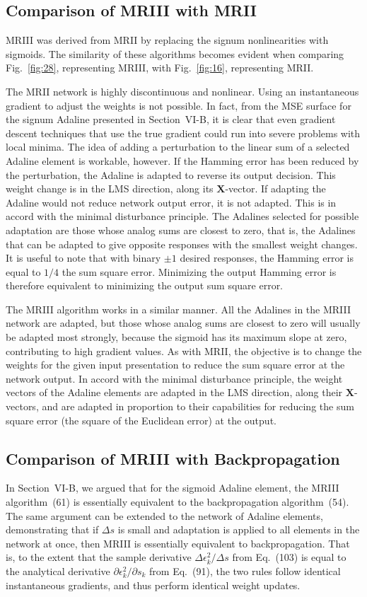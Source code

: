 \documentclass[10pt,twocolumn]{article}
\newcommand{\X}{\bm{X}}
\begin{document}
\subsection{Comparison of MRIII with MRII}
MRIII was derived from MRII by replacing the signum nonlinearities with sigmoids.
The similarity of these algorithms becomes evident when comparing Fig.~\ref{fig:28},
representing MRIII, with Fig.~\ref{fig:16}, representing MRII.

The MRII network is highly discontinuous and nonlinear. Using an instantaneous
gradient to adjust the weights is not possible. In fact, from the MSE surface for
the signum Adaline presented in Section~VI-B, it is clear that even gradient descent
techniques that use the true gradient could run into severe problems with local
minima. The idea of adding a perturbation to the linear sum of a selected Adaline
element is workable, however. If the Hamming error has been reduced by the
perturbation, the Adaline is adapted to reverse its output decision. This weight
change is in the LMS direction, along its $\X$-vector. If adapting the Adaline would
not reduce network output error, it is not adapted. This is in accord with the
minimal disturbance principle. The Adalines selected for possible adaptation are
those whose analog sums are closest to zero, that is, the Adalines that can be
adapted to give opposite responses with the smallest weight changes. It is useful to
note that with binary $\pm 1$ desired responses, the Hamming error is equal to
$1/4$ the sum square error. Minimizing the output Hamming error is therefore
equivalent to minimizing the output sum square error.

The MRIII algorithm works in a similar manner. All the Adalines in the MRIII network
are adapted, but those whose analog sums are closest to zero will usually be adapted
most strongly, because the sigmoid has its maximum slope at zero, contributing to
high gradient values. As with MRII, the objective is to change the weights for the
given input presentation to reduce the sum square error at the network output. In
accord with the minimal disturbance principle, the weight vectors of the Adaline
elements are adapted in the LMS direction, along their $\X$-vectors, and are adapted
in proportion to their capabilities for reducing the sum square error (the square of
the Euclidean error) at the output.

\subsection{Comparison of MRIII with Backpropagation}
In Section~VI-B, we argued that for the sigmoid Adaline element, the MRIII
algorithm~(61) is essentially equivalent to the backpropagation algorithm~(54). The
same argument can be extended to the network of Adaline elements, demonstrating that
if $\Delta s$ is small and adaptation is applied to all elements in the network at
once, then MRIII is essentially equivalent to backpropagation. That is, to the
extent that the sample derivative $\Delta\epsilon_k^2/\Delta s$ from Eq.~(103) is
equal to the analytical derivative $\partial\epsilon_k^2/\partial s_k$ from Eq.~(91),
the two rules follow identical instantaneous gradients, and thus perform identical
weight updates.
\end{document}
